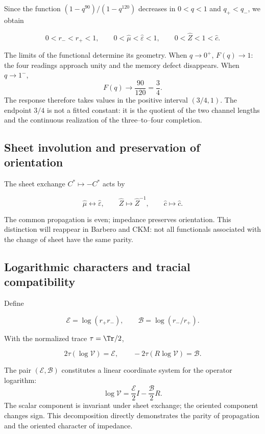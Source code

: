 Since the function \((1-q^{90})/(1-q^{120})\) decreases in \(0<q<1\) and \(q_+<q_-\), we obtain

\[
0<r_-<r_+<1,\qquad
0<\widehat\mu<\widehat\varepsilon<1,\qquad
0<\widehat Z<1<\widehat c.
\]

The limits of the functional determine its geometry. When \(q\to0^+\),
\(F(q)\to1\): the four readings approach unity and the memory
defect disappears. When \(q\to1^-\),
\[
F(q)\longrightarrow\frac{90}{120}=\frac34.
\]
The response therefore takes values in the positive interval \((3/4,1)\). The
endpoint \(3/4\) is not a fitted constant: it is the quotient of the two
channel lengths and the continuous realization of the
three--to--four completion.

\subsection{Sheet involution and preservation of orientation}

The sheet exchange \(C^*\mapsto-C^*\) acts by

\begin{equation}
\widehat\mu\longleftrightarrow\widehat\varepsilon,\qquad
\widehat Z\longmapsto\widehat Z^{-1},
\qquad
\widehat c\longmapsto\widehat c.
\label{rm:eq:vacuum-sheet}
\end{equation}

The common propagation is even; impedance preserves orientation.
This distinction will reappear in Barbero and CKM: not all functionals
associated with the change of sheet have the same parity.

\subsection{Logarithmic characters and tracial compatibility}

Define

\[
\mathcal E=\log(r_+r_-),\qquad
\mathcal B=\log(r_-/r_+).
\]

With the normalized trace \(\tau=\Tr/2\),

\begin{equation}
2\tau(\log\mathcal V)=\mathcal E,
\qquad
-2\tau(R\log\mathcal V)=\mathcal B.
\label{rm:eq:vacuum-traces}
\end{equation}

The pair \((\mathcal E,\mathcal B)\) constitutes a linear coordinate system for the operator
logarithm:
\begin{equation}
\log\mathcal V
=\frac{\mathcal E}{2}I-\frac{\mathcal B}{2}R.
\label{rm:eq:vacuum-log-decomposition}
\end{equation}
The scalar component is invariant under sheet exchange; the
oriented component changes sign. This decomposition directly
demonstrates the parity of propagation and the oriented character of
impedance.

